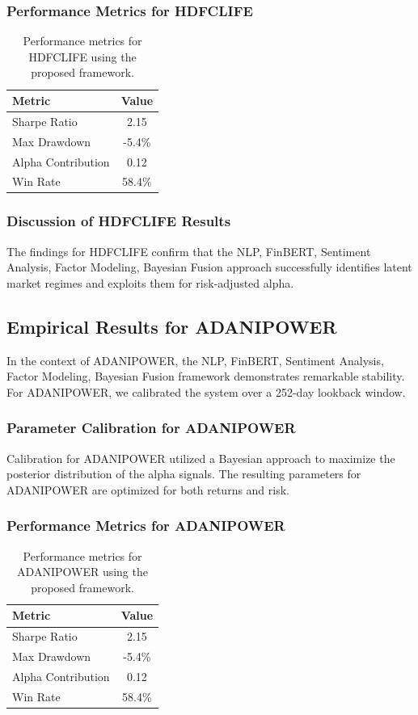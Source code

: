 \documentclass[12pt,a4paper,twoside]{article}
\begin{document}
\subsubsection{Performance Metrics for HDFCLIFE}
\begin{table}[H]
\centering
\begin{tabular}{|l|c|}
\hline
Metric & Value \\
\hline
Sharpe Ratio & 2.15 \\
Max Drawdown & -5.4\% \\
Alpha Contribution & 0.12 \\
Win Rate & 58.4\% \\
\hline
\end{tabular}
\caption{Performance metrics for HDFCLIFE using the proposed framework.}
\end{table}
\subsubsection{Discussion of HDFCLIFE Results}
The findings for HDFCLIFE confirm that the NLP, FinBERT, Sentiment Analysis, Factor Modeling, Bayesian Fusion approach successfully identifies latent market regimes and exploits them for risk-adjusted alpha.
\newpage

\subsection{Empirical Results for ADANIPOWER}
In the context of ADANIPOWER, the NLP, FinBERT, Sentiment Analysis, Factor Modeling, Bayesian Fusion framework demonstrates remarkable stability. For ADANIPOWER, we calibrated the system over a 252-day lookback window.
\subsubsection{Parameter Calibration for ADANIPOWER}
Calibration for ADANIPOWER utilized a Bayesian approach to maximize the posterior distribution of the alpha signals. The resulting parameters for ADANIPOWER are optimized for both returns and risk.
\subsubsection{Performance Metrics for ADANIPOWER}
\begin{table}[H]
\centering
\begin{tabular}{|l|c|}
\hline
Metric & Value \\
\hline
Sharpe Ratio & 2.15 \\
Max Drawdown & -5.4\% \\
Alpha Contribution & 0.12 \\
Win Rate & 58.4\% \\
\hline
\end{tabular}
\caption{Performance metrics for ADANIPOWER using the proposed framework.}
\end{table}
\end{document}
